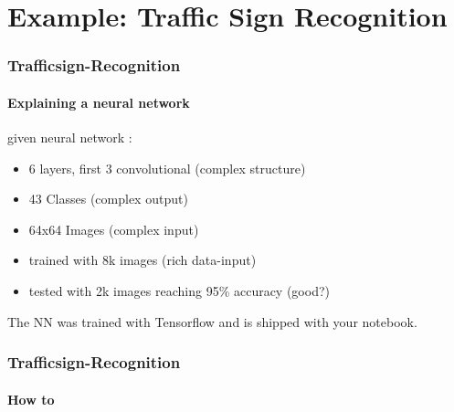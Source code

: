 \section{Example: Traffic Sign Recognition}

\begin{frame}
	\frametitle{Trafficsign-Recognition}
	\framesubtitle{Explaining a neural network}
	\begin{Large}
		given neural network :
		\begin{itemize}
				\item 6 layers, first 3 convolutional (complex structure)
				\item 43 Classes (complex output)
				\item 64x64 Images (complex input) 
				\item trained with 8k images (rich data-input)
				\item tested with 2k images reaching 95\% accuracy (good?)
		\end{itemize}
	\end{Large}
	The NN was trained with Tensorflow and is shipped with your notebook. 
\end{frame}

\begin{frame}
	\frametitle{Trafficsign-Recognition}
	\framesubtitle{How to}
	
\end{frame}


